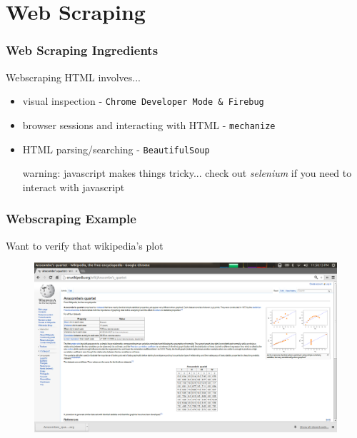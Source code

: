 \documentclass{beamer}
\begin{document}
\section{Web Scraping}

\begin{frame}
\frametitle{Web Scraping Ingredients}
Webscraping HTML involves...
\vspace{0.2in}
\begin{itemize}
\setlength{\itemsep}{0.1in}
\item{visual inspection - \texttt{Chrome Developer Mode \& Firebug}}
\item{browser sessions and interacting with HTML - \texttt{mechanize}}
\item{HTML parsing/searching - \texttt{BeautifulSoup}}
\vspace{0.2in}

warning: javascript makes things tricky... check out \textit{selenium} if you need to interact with javascript
\end{itemize}
\end{frame}


\begin{frame}
\frametitle{Webscraping Example}
Want to verify that wikipedia's plot
\begin{figure}[h]
\centering
\includegraphics[width=.9\textwidth]{images/anscombe.png}
\end{figure}
\end{frame}
\end{document}
